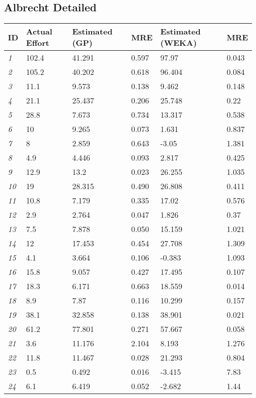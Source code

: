 \documentclass[albrecht.tex]{subfiles}
\begin{document}
	\subsection{Albrecht Detailed} %
	\label{sub:albrecht_detailed}
	\begin{tabularx}{\textwidth}{| X | X || X | X || X | X |}
	\hline
	\textbf{ID} & \textbf{Actual \newline Effort} & \textbf{Estimated (GP)} &
	\textbf{MRE} & \textbf{Estimated (WEKA)} & \textbf{MRE} \\	\hline
	\emph{1} & 102.4 & 41.291 & 0.597 & 97.97 & 0.043 \\
	\emph{2} & 105.2 & 40.202 & 0.618 & 96.404 & 0.084 \\
	\emph{3} & 11.1 & 9.573 & 0.138 & 9.462 & 0.148 \\
	\emph{4} & 21.1 & 25.437 & 0.206 & 25.748 & 0.22 \\
	\emph{5} & 28.8 & 7.673 & 0.734 & 13.317 & 0.538 \\
	\emph{6} & 10 & 9.265 & 0.073 & 1.631 & 0.837 \\
	\emph{7} & 8 & 2.859 & 0.643 & -3.05 & 1.381 \\
	\emph{8} & 4.9 & 4.446 & 0.093 & 2.817 & 0.425 \\
	\emph{9} & 12.9 & 13.2 & 0.023 & 26.255 & 1.035 \\
	\emph{10} & 19 & 28.315 & 0.490 & 26.808 & 0.411 \\
	\emph{11} & 10.8 & 7.179 & 0.335 & 17.02 & 0.576 \\
	\emph{12} & 2.9 & 2.764 & 0.047 & 1.826 & 0.37 \\
	\emph{13} & 7.5 & 7.878 & 0.050 & 15.159 & 1.021 \\
	\emph{14} & 12 & 17.453 & 0.454 & 27.708 & 1.309 \\
	\emph{15} & 4.1 & 3.664 & 0.106 & -0.383 & 1.093 \\
	\emph{16} & 15.8 & 9.057 & 0.427 & 17.495 & 0.107 \\
	\emph{17} & 18.3 & 6.171 & 0.663 & 18.559 & 0.014 \\
	\emph{18} & 8.9 & 7.87 & 0.116 & 10.299 & 0.157 \\
	\emph{19} & 38.1 & 32.858 & 0.138 & 38.901 & 0.021 \\
	\emph{20} & 61.2 & 77.801 & 0.271 & 57.667 & 0.058 \\
	\emph{21} & 3.6 & 11.176 & 2.104 & 8.193 & 1.276 \\
	\emph{22} & 11.8 & 11.467 & 0.028 & 21.293 & 0.804 \\
	\emph{23} & 0.5 & 0.492 & 0.016 & -3.415 & 7.83 \\
	\emph{24} & 6.1 & 6.419 & 0.052 & -2.682 & 1.44 \\
	\hline
	\end{tabularx}
\end{document}
